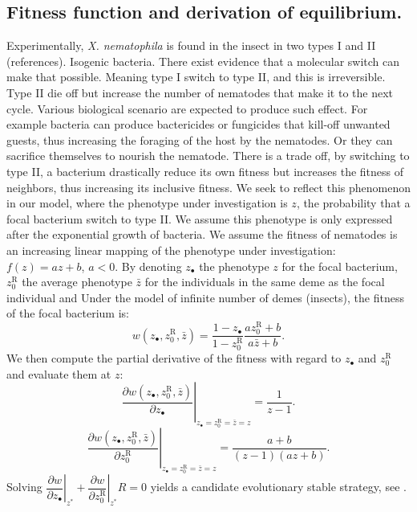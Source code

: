 \documentclass[10pt]{article}
\newcommand{\Xnema}{\textit{X. nematophila} }
\begin{document}
\begin{multicols}{2}
\section*{Fitness function and derivation of equilibrium.}
Experimentally, \Xnema is found  in the insect in two types I and II (references).
Isogenic bacteria. There exist evidence that a molecular switch can make that possible. Meaning type I switch to type II, and this is irreversible. Type II die off but increase the number of nematodes that make it to the next cycle. Various biological scenario are expected to produce such effect. For example bacteria can produce bactericides or fungicides that kill-off unwanted guests, thus increasing the foraging of the host by the nematodes. Or they can sacrifice themselves to nourish the nematode.
There is a trade off, by switching to type II, a bacterium drastically reduce its own fitness but increases the fitness of neighbors, thus increasing its inclusive fitness.
We seek to reflect this phenomenon in our model, where the phenotype under investigation is $z$, the probability that a focal bacterium switch to type II.
We assume this phenotype is only expressed after the exponential growth of bacteria. 
We assume the fitness of nematodes is an increasing linear mapping of the phenotype under investigation: $f (z)=az+b$, $a<0$.
By denoting $z_\bullet $ the phenotype $z$ for the focal bacterium, $ z_0^{\mathrm{R}}$ the average phenotype $\bar{z}$ for the individuals in the same deme as the focal individual and 
  Under the model of infinite number of demes (insects), the fitness of the focal bacterium is:
  \begin{equation}
  w(z_\bullet ,z_0^{\mathrm{R}} , \bar{z} ) = \dfrac{1-z_\bullet}{1- z_0^{\mathrm{R}}}\dfrac{a z_0^{\mathrm{R}} +b }{a \bar{z} +b}.
  \end{equation}
  We then compute the partial derivative of the fitness with regard to $z_\bullet$ and $z_0^{\mathrm{R}}$ and evaluate them at $z$:
  \begin{equation}
   \left. \dfrac{\partial w(z_\bullet ,z_0^{\mathrm{R}} , \bar{z} )}{\partial z_\bullet} \right\vert_{z_\bullet = z_0^{\mathrm{R}} = \bar{z}=z} = \dfrac{1}{ z-1 }.
  \end{equation}
  \begin{equation}
   \left. \dfrac{\partial w(z_\bullet ,z_0^{\mathrm{R}} , \bar{z} )}{\partial z_0^{\mathrm{R}}} \right\vert_{z_\bullet = z_0^{\mathrm{R}} = \bar{z}=z} = \dfrac{a +b}{( z - 1 )(a z +b)}.
  \end{equation}
  Solving $\left. \dfrac{\partial w}{\partial z_\bullet} \right\vert_{z^*} + \left. \dfrac{\partial w}{\partial z_0^{\mathrm{R}}} \right\vert_{z^*} R =0 $ yields a candidate evolutionary stable strategy, see \cite{rousset2004genetic}.

\end{multicols}
\end{document}
